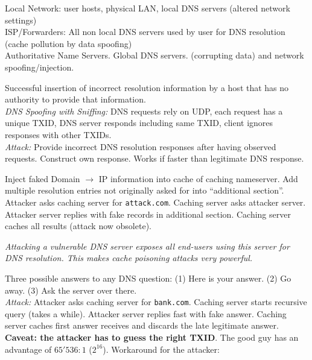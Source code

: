 Local Network: user hosts, physical LAN, local DNS servers (altered network settings)\\
ISP/Forwarders: All non local DNS servers used by user for DNS resolution (cache pollution by data spoofing) \\
Authoritative Name Servers. Global DNS servers. (corrupting data) and network spoofing/injection.

 Successful insertion of incorrect resolution information by a host that has no authority to provide that information. \\
\textit{DNS Spoofing with Sniffing:} DNS requests rely on UDP, each request has a unique TXID, DNS server responds including same TXID, client ignores responses with other TXIDs.\\
\textit{Attack:} Provide incorrect DNS resolution responses after having observed requests. Construct own response. Works if faster than legitimate DNS response.

 Inject faked Domain $\to$ IP information into cache of caching nameserver. Add multiple resolution entries not originally asked for into ``additional section''. Attacker asks caching server for {\tt attack.com}. Caching server asks attacker server. Attacker server replies with fake records in additional section. Caching server caches all results (attack now obsolete).

\textit{Attacking a vulnerable DNS server exposes all end-users using this server for DNS resolution. This makes cache poisoning attacks very powerful.}

 Three possible answers to any DNS question: (1) Here is your answer. (2) Go away. (3) Ask the server over there. \\
\textit{Attack:} Attacker asks caching server for {\tt bank.com}. Caching server starts recursive query (takes a while). Attacker server replies fast with fake answer. Caching server caches first answer receives and discards the late legitimate answer. \textbf{Caveat: the attacker has to guess the right TXID}. The good guy has an advantage of $65'536:1$ ($2^{16}$). Workaround for the attacker:

